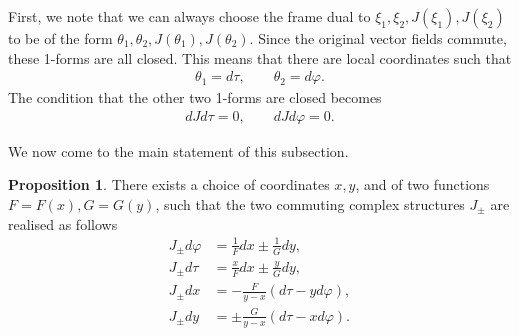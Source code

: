 \documentclass[10pt]{report}
\theoremstyle{definition}
\newtheorem{proposition}{Proposition}[chapter]
\begin{document}
First, we note that we can always choose the frame dual to $\xi_1,\xi_2,J(\xi_1),J(\xi_2)$ to be of the form $\theta_1,\theta_2,J(\theta_1),J(\theta_2)$. Since the original vector fields commute, these 1-forms are all closed. This means that there are local coordinates such that 
   \begin{align} 
   \theta_1 = d\tau, \qquad \theta_2= d\varphi.
   \end{align}
   The condition that the other two 1-forms are closed becomes
    \begin{align} 
   dJd\tau = 0, \qquad dJ d\varphi =0.
   \end{align}

We now come to the main statement of this subsection.
\begin{proposition} There exists a choice of coordinates $x,y$, and of two functions $F=F(x), G=G(y)$, such that the two commuting complex structures $J_\pm$ are realised as follows
\begin{align}
 J_\pm d\varphi &= \frac{1}{F}dx \pm \frac{1}{G} dy, \nonumber \\
    J_\pm d\tau &= \frac{x}{F}dx  \pm \frac{y}{G} dy, \nonumber\\
    J_\pm dx &= -\frac{F}{y-x}(d\tau - y d\varphi), \nonumber\\
    J_\pm dy &= \pm \frac{G}{y-x}(d\tau - x d\varphi). \label{eq:J_pm_action_on_txyf_basis}
\end{align}
\end{proposition}
\end{document}
